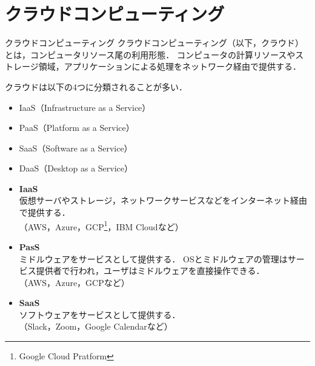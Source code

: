 \section{クラウドコンピューティング}\hypertarget{sec:クラウドコンピューティング}{}
\tocc
\begin{frame}[t]{\fftitle}
    \begin{block}{クラウドコンピューティング}
        クラウドコンピューティング（以下，クラウド）とは，コンピュータリソース尾の利用形態．
        コンピュータの計算リソースやストレージ領域，アプリケーションによる処理をネットワーク経由で提供する．\hfill\cite{2015amazon}
    \end{block}
    クラウドは以下の4つに分類されることが多い．
    \begin{itemize}
        \setlength{\itemsep}{1em}
        \item IaaS（Infrastructure as a Service）
        \item PaaS（Platform as a Service）
        \item SaaS（Software as a Service）
        \item DaaS（Desktop as a Service）%
    \end{itemize}
\end{frame}
\begin{frame}[t]{\fftitle}
    \begin{itemize}
        \item \textbf{IaaS}\\
              仮想サーバやストレージ，ネットワークサービスなどをインターネット経由で提供する．\\（AWS，Azure，GCP\footnote{Google Cloud Pratform}，IBM Cloudなど）
        \item \textbf{PasS}\\
              ミドルウェアをサービスとして提供する．
              OSとミドルウェアの管理はサービス提供者で行われ，ユーザはミドルウェアを直接操作できる．\\（AWS，Azure，GCPなど）
        \item \textbf{SaaS}\\
              ソフトウェアをサービスとして提供する．\\（Slack，Zoom，Google Calendarなど）
    \end{itemize}
    \hfill\cite{2015amazon}
\end{frame}
